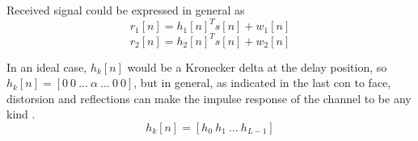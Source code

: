   Received signal could be expressed in general as
  $$ r_1[n] = h_1[n]^T s[n] + w_1[n] $$
  $$ r_2[n] = h_2[n]^T s[n] + w_2[n] $$
  
  In an ideal case, $h_k[n]$ would be a Kronecker delta at the delay position, so $h_k[n] = [0\ 0\ ...\ \alpha\ ...\ 0\ 0]$, but in general, as indicated in the last con to face, distorsion and reflections can make the impulse response of the channel to be any kind \cite{overview}.
  $$ h_k[n] = [h_0\ h_1\ ...\ h_{L-1}] $$
  
